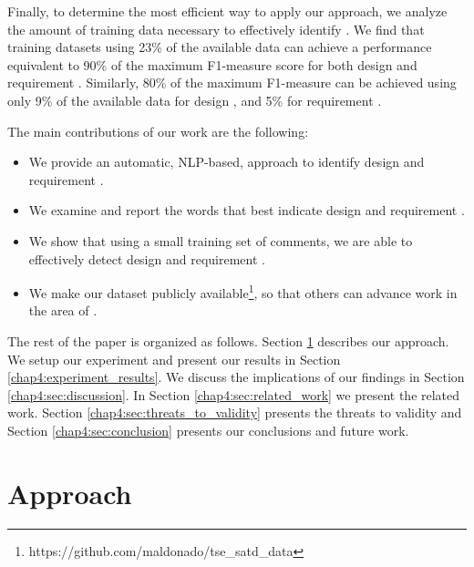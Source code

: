 Finally, to determine the most efficient way to apply our approach, we analyze the amount of training data necessary to effectively identify \SATD. We find that training datasets using 23\% of the available data can achieve a performance equivalent to 90\% of the maximum F1-measure score for both design and requirement \SATD. Similarly, 80\% of the maximum F1-measure can be achieved using only 9\% of the available data for design \SATD, and 5\% for requirement \SATD.

The main contributions of our work are the following:
\begin{itemize}
  \item We provide an automatic, NLP-based, approach to identify design and requirement \SATD.
  \item We examine and report the words that best indicate design and requirement \SATD.
  \item We show that using a small training set of comments, we are able to effectively detect design and requirement \SATD.
  \item We make our dataset publicly available\footnote{https://github.com/maldonado/tse\_satd\_data}, so that others can advance work in the area of \SATD.
\end{itemize}

The rest of the paper is organized as follows. Section \ref{chap4:sec:approach} describes our approach. We setup our experiment and present our
results in Section \ref{chap4:experiment_results}. We discuss the implications of our findings in Section \ref{chap4:sec:discussion}. In Section \ref{chap4:sec:related_work} we present the related work. Section \ref{chap4:sec:threats_to_validity} presents the threats to validity and Section \ref{chap4:sec:conclusion} presents our conclusions and future work.  

\section{Approach}
\label{chap4:sec:approach}

